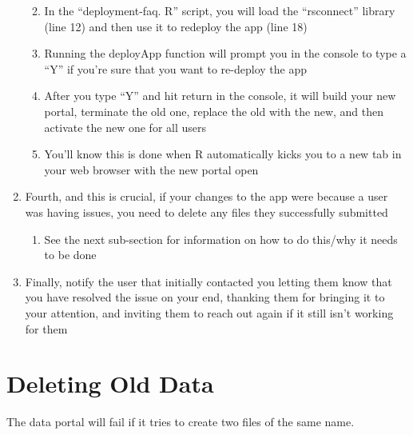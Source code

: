 \documentclass[
  letterpaper,
  DIV=11,
  numbers=noendperiod]{scrreprt}
\providecommand{\tightlist}{%
  \setlength{\itemsep}{0pt}\setlength{\parskip}{0pt}}\usepackage{longtable,booktabs,array}
\begin{document}
\begin{enumerate}
  \begin{enumerate}
  \def\labelenumii{\roman{enumii}.}
  \item
    In the ``deployment-faq. R'' script, you will load the ``rsconnect''
    library (line 12) and then use it to redeploy the app (line 18)
  \item
    Running the deployApp function will prompt you in the console to
    type a ``Y'' if you're sure that you want to re-deploy the app
  \item
    After you type ``Y'' and hit return in the console, it will build
    your new portal, terminate the old one, replace the old with the
    new, and then activate the new one for all users
  \item
    You'll know this is done when R automatically kicks you to a new tab
    in your web browser with the new portal open
  \end{enumerate}
\item
  Fourth, and this is crucial, if your changes to the app were because a
  user was having issues, you need to delete any files they successfully
  submitted

  \begin{enumerate}
  \def\labelenumii{\roman{enumii}.}
  \tightlist
  \item
    See the next sub-section for information on how to do this/why it
    needs to be done
  \end{enumerate}
\item
  Finally, notify the user that initially contacted you letting them
  know that you have resolved the issue on your end, thanking them for
  bringing it to your attention, and inviting them to reach out again if
  it still isn't working for them
\end{enumerate}

\section{Deleting Old Data}\label{deleting-old-data}

The data portal will fail if it tries to create two files of the same
name.
\end{document}
